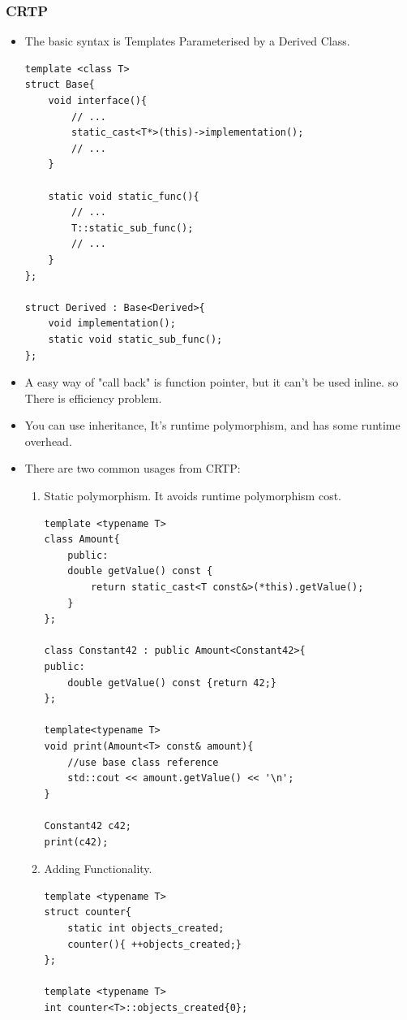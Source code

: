 \documentclass[a4paper,11pt,twoside]{book}
\begin{document}
\subsubsection{CRTP}
\begin{itemize}
	\item The basic syntax is Templates Parameterised by a Derived Class.
	
\begin{lstlisting}[numbers=none]
template <class T> 
struct Base{
	void interface(){
		// ...
		static_cast<T*>(this)->implementation();
		// ...
	}
	
	static void static_func(){
		// ...
		T::static_sub_func();
		// ...
	}
};
	
struct Derived : Base<Derived>{
	void implementation();
	static void static_sub_func();
};
\end{lstlisting}
	
	\item A easy way of "call back" is function pointer, but it can't be used inline. so There is efficiency problem. 
	
	\item You can use inheritance, It's runtime polymorphism, and has some runtime overhead. 
	
	\item There are two common usages from CRTP:
	\begin{enumerate}
		\item Static polymorphism. It avoids runtime polymorphism cost. 
\begin{lstlisting}[numbers=none]
template <typename T>
class Amount{
	public:
	double getValue() const {
		return static_cast<T const&>(*this).getValue();
	}
};

class Constant42 : public Amount<Constant42>{
public:
	double getValue() const {return 42;}
};

template<typename T>
void print(Amount<T> const& amount){
	//use base class reference
	std::cout << amount.getValue() << '\n';
}

Constant42 c42;
print(c42);
\end{lstlisting}

\item Adding Functionality.

\begin{lstlisting}[numbers=none]
template <typename T>
struct counter{
	static int objects_created;
	counter(){ ++objects_created;}
};

template <typename T> 
int counter<T>::objects_created{0};


\end{lstlisting}
\end{enumerate}
\end{itemize}
\end{document}
